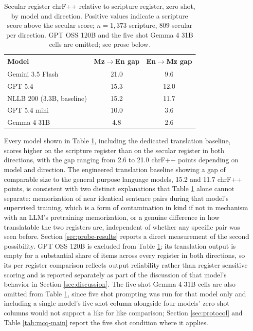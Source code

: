 \documentclass[pdflatex,sn-mathphys-ay]{sn-jnl}
\begin{document}
\begin{table}[t]
\centering
\small
\begin{tabular}{lcc}
\toprule
\textbf{Model} & \textbf{Mz$\to$En gap} & \textbf{En$\to$Mz gap} \\
\midrule
Gemini 3.5 Flash & 21.0 & 9.6 \\
GPT 5.4 & 15.3 & 12.0 \\
NLLB 200 (3.3B, baseline) & 15.2 & 11.7 \\
GPT 5.4 mini & 10.0 & 3.6 \\
Gemma 4 31B & 4.8 & 2.6 \\
\bottomrule
\end{tabular}
\caption{Secular register chrF++ relative to scripture register, zero shot, by model and direction. Positive values indicate a scripture score above the secular score; $n{=}1{,}373$ scripture, $809$ secular per direction. GPT OSS 120B and the five shot Gemma 4 31B cells are omitted; see prose below.}
\label{tab:mt-register}
\end{table}

Every model shown in Table \ref{tab:mt-register}, including the dedicated translation baseline, scores higher on the scripture register than on the secular register in both directions, with the gap ranging from 2.6 to 21.0 chrF++ points depending on model and direction. The engineered translation baseline showing a gap of comparable size to the general purpose language models, 15.2 and 11.7 chrF++ points, is consistent with two distinct explanations that Table \ref{tab:mt-register} alone cannot separate: memorization of near identical sentence pairs during that model's supervised training, which is a form of contamination in kind if not in mechanism with an LLM's pretraining memorization, or a genuine difference in how translatable the two registers are, independent of whether any specific pair was seen before. Section \ref{sec:probe-results} reports a direct measurement of the second possibility. GPT OSS 120B is excluded from Table \ref{tab:mt-register}; its translation output is empty for a substantial share of items across every register in both directions, so its per register comparison reflects output reliability rather than register sensitive scoring and is reported separately as part of the discussion of that model's behavior in Section \ref{sec:discussion}. The five shot Gemma 4 31B cells are also omitted from Table \ref{tab:mt-register}, since five shot prompting was run for that model only and including a single model's five shot column alongside four models' zero shot columns would not support a like for like comparison; Section \ref{sec:protocol} and Table \ref{tab:mcq-main} report the five shot condition where it applies.
\end{document}
